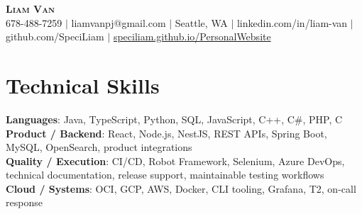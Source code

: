 \documentclass[letterpaper,11pt]{article}
\begin{document}

%
\begin{center}
    \textbf{\Huge \scshape Liam Van} \\ \vspace{1pt}
    \small 678-488-7259 $|$ \small {liamvanpj@gmail.com} $|$ Seattle, WA
 {{$|$ linkedin.com/in/liam-van} {$|$ github.com/SpeciLiam} {$|$ \href{https://speciliam.github.io/PersonalWebsite}{speciliam.github.io/PersonalWebsite}}}

\end{center}

\section{Technical Skills}
 \begin{itemize}[leftmargin=0.15in, label={}]
    \small{\item{
     \textbf{Languages}{: Java, TypeScript, Python, SQL, JavaScript, C++, C\#, PHP, C} \\
     \textbf{Product / Backend}{: React, Node.js, NestJS, REST APIs, Spring Boot, MySQL, OpenSearch, product integrations} \\
     \textbf{Quality / Execution}{: CI/CD, Robot Framework, Selenium, Azure DevOps, technical documentation, release support, maintainable testing workflows} \\
     \textbf{Cloud / Systems}{: OCI, GCP, AWS, Docker, CLI tooling, Grafana, T2, on-call response} \\
    }}
 \end{itemize}
%
\end{document}
